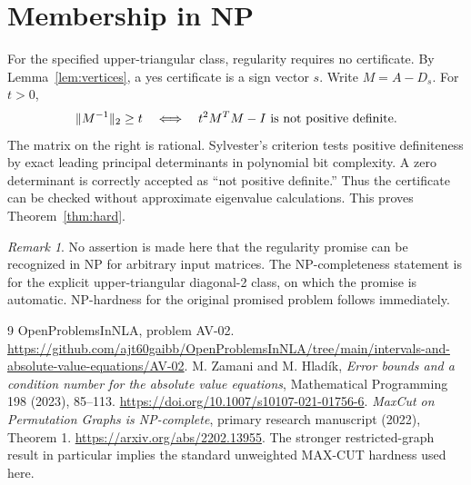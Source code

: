 \documentclass[11pt,a4paper]{article}
\theoremstyle{remark}\newtheorem{remark}[theorem]{Remark}
\newcommand{\repo}[1]{\url{https://github.com/ajt60gaibb/OpenProblemsInNLA/tree/main/intervals-and-absolute-value-equations/#1}}
\begin{document}
\section{Membership in NP}
For the specified upper-triangular class, regularity requires no certificate. By Lemma~\ref{lem:vertices}, a yes certificate is a sign vector $s$. Write $M=A-D_s$. For $t>0$,
\[
 \|M^{-1}\|_2\ge t
 \quad\Longleftrightarrow\quad
 t^2M^TM-I\ \hbox{is not positive definite}.
\]
The matrix on the right is rational. Sylvester's criterion tests positive definiteness by exact leading principal determinants in polynomial bit complexity. A zero determinant is correctly accepted as ``not positive definite.'' Thus the certificate can be checked without approximate eigenvalue calculations. This proves Theorem~\ref{thm:hard}.
\begin{remark}
No assertion is made here that the regularity promise can be recognized in NP for arbitrary input matrices. The NP-completeness statement is for the explicit upper-triangular diagonal-2 class, on which the promise is automatic. NP-hardness for the original promised problem follows immediately.
\end{remark}
\begin{thebibliography}{9}
 OpenProblemsInNLA, problem AV-02. \repo{AV-02}.
 M. Zamani and M. Hlad\'ik, \emph{Error bounds and a condition number for the absolute value equations}, Mathematical Programming 198 (2023), 85--113. \url{https://doi.org/10.1007/s10107-021-01756-6}.
 \emph{MaxCut on Permutation Graphs is NP-complete}, primary research manuscript (2022), Theorem 1. \url{https://arxiv.org/abs/2202.13955}. The stronger restricted-graph result in particular implies the standard unweighted MAX-CUT hardness used here.
\end{thebibliography}
\end{document}
